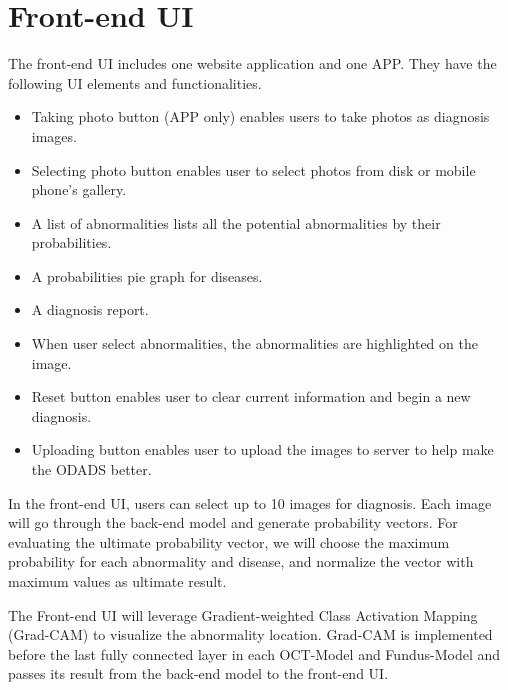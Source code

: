\documentclass{article}
\begin{document}
	\section{Front-end UI}
	
		The front-end UI includes one website application and one APP.  They have the following UI elements and functionalities.
		
		\begin{itemize}
		\vspace{-0.2cm}
		\item Taking photo button (APP only) enables users to take photos as diagnosis images.
		\vspace{-0.2cm} 
		\item Selecting photo button enables user to select photos from disk or mobile phone's gallery.
		\vspace{-0.2cm} 
		\item A list of abnormalities lists all the potential abnormalities by their probabilities.
		\vspace{-0.2cm} 
		\item A probabilities pie graph for diseases.
		\vspace{-0.2cm} 
		\item A diagnosis report.
		\vspace{-0.2cm} 
		\item When user select abnormalities, the abnormalities are highlighted on the image.
		\vspace{-0.2cm} 
		\item Reset button enables user to clear current information and begin a new diagnosis.
		\vspace{-0.2cm} 
		\item Uploading button enables user to upload the images to server to help make the ODADS better.
	\end{itemize}		
	
	\vspace{0.2cm}
	
	In the front-end UI, users can select up to 10 images for diagnosis.  Each image will go through the back-end model and generate probability vectors.  For evaluating the ultimate probability vector, we will choose the maximum probability for each abnormality and disease, and normalize the vector with maximum values as ultimate result.
	
	The Front-end UI will leverage Gradient-weighted Class Activation Mapping (Grad-CAM) to visualize the abnormality location.  Grad-CAM is implemented before the last fully connected layer in each OCT-Model and Fundus-Model and passes its result from the back-end model to the front-end UI.
	
\end{document}

